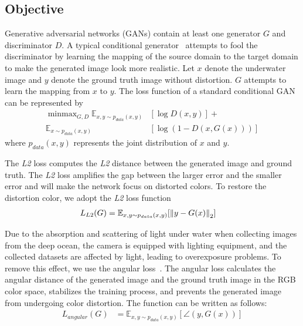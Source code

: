 \documentclass[utf8]{FrontiersinHarvard} %
\begin{document}
\subsection{Objective}
Generative adversarial networks (GANs) contain at least one generator $G$ and discriminator $D$. A typical conditional generator~\citep{8100115} attempts to fool the discriminator by learning the mapping of the source domain to the target domain to make the generated image look more realistic. Let $x$ denote the underwater image and $y$ denote the ground truth image without distortion. $G$ attempts to learn the mapping from $x$ to $y$. The loss function of a standard conditional GAN can be represented by
\begin{equation}
\begin{aligned}
\mathop{\min\max}_{G,D}\mathbb{E}_{x,y\sim{p_{data}(x,y)}}&[\log{D(x,y)}]+\\ \mathbb{E}_{x\sim{p_{data}(x,y)}}&[\log(1-D(x, G(x)))]
\end{aligned}
\label{eq:cgan}
\end{equation}
where $p_{data}(x,y)$ represents the joint distribution of $x$ and $y$. 

The \textit{L2} loss computes the \textit{L2} distance between the generated image and ground truth. The \textit{L2} loss amplifies the gap between the larger error and the smaller error and will make the network focus on distorted colors. To restore the distortion color, we adopt the \textit{L2} loss function
\begin{equation}
\begin{aligned}
L_{L2}(G)&=\mathbb{E}_{x,y\sim{p_{data}(x,y)}}[{\Arrowvert y-G(x)\Arrowvert}_{2}]
\end{aligned}
\label{eq:l2}
\end{equation}

Due to the absorption and scattering of light under water when collecting images from the deep ocean, the camera is equipped with lighting equipment, and the collected datasets are affected by light, leading to overexposure problems. To remove this effect, we use the angular loss~\citep{2019Artificial}. The angular loss calculates the angular distance of the generated image and the ground truth image in the RGB color space, stabilizes the training process, and prevents the generated image from undergoing color distortion. The function can be written as follows:\begin{equation}
\begin{aligned}
L_{angular}(G)&=\mathbb{E}_{x,y\sim{p_{data}(x,y)}}[\angle{(y,G(x))}]
\end{aligned}
\label{eq:angular}
\end{equation}
\end{document}
